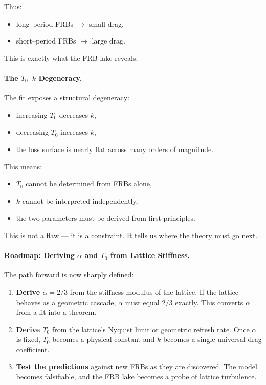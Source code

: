 \documentclass[11pt, letterpaper, openany]{book}
\begin{document}
Thus:

\begin{itemize}
    \item long--period FRBs $\rightarrow$ small drag,
    \item short--period FRBs $\rightarrow$ large drag.
\end{itemize}

This is exactly what the FRB lake reveals.

\paragraph{The $T_0$--$k$ Degeneracy.}

The fit exposes a structural degeneracy:

\begin{itemize}
    \item increasing $T_0$ decreases $k$,
    \item decreasing $T_0$ increases $k$,
    \item the loss surface is nearly flat across many orders of magnitude.
\end{itemize}

This means:

\begin{itemize}
    \item $T_0$ cannot be determined from FRBs alone,
    \item $k$ cannot be interpreted independently,
    \item the two parameters must be derived from first principles.
\end{itemize}

This is not a flaw --- it is a constraint.  
It tells us where the theory must go next.

\paragraph{Roadmap: Deriving $\alpha$ and $T_0$ from Lattice Stiffness.}

The path forward is now sharply defined:

\begin{enumerate}
    \item \textbf{Derive $\alpha = 2/3$} from the stiffness modulus of the lattice.  
    If the lattice behaves as a geometric cascade, $\alpha$ must equal $2/3$ exactly.  
    This converts $\alpha$ from a fit into a theorem.

    \item \textbf{Derive $T_0$} from the lattice's Nyquist limit or geometric refresh rate.  
    Once $\alpha$ is fixed, $T_0$ becomes a physical constant and $k$ becomes a single universal 
    drag coefficient.

    \item \textbf{Test the predictions} against new FRBs as they are discovered.  
    The model becomes falsifiable, and the FRB lake becomes a probe of lattice turbulence.
\end{enumerate}
\end{document}
